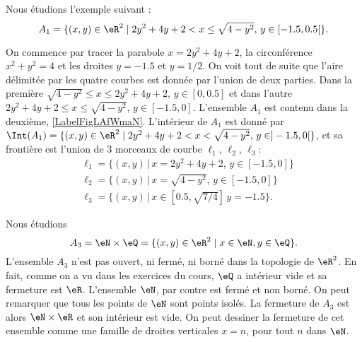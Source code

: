 \begin{example}
    Nous étudions l'exemple suivant :
    \begin{equation}
        A_1 = \{ (x, y ) \in \eR^2 \; | \; 2y^2+4y+2<x\leq \sqrt{4- y^2},\, y\in [-1.5, 0.5[ \}.
    \end{equation}

 On commence par tracer la parabole $x=2y^2+4y+2$, la circonférence $x^2+y^2=4$ et les droites $y=-1.5$ et $y=1/2$. On voit tout de suite que l'aire délimitée par les quatre courbes est donnée par l'union de deux parties. Dans la première $\sqrt{4- y^2}\leq x\leq 2y^2+4y+2$, $y\in [0,0.5]$ et dans l'autre $2y^2+4y+2\leq x\leq \sqrt{4- y^2}$, $y\in [-1.5, 0]$. L'ensemble $A_1$ est contenu dans la deuxième, \ref{LabelFigLAfWmaN}. L'intérieur de $A_1$ est donné par $\Int(A_1) = \{ (x, y ) \in \eR^2 \; | \; 2y^2+4y+2<x< \sqrt{4- y^2},\, y\in ]-1.5, 0[ \}$, et sa frontière est l'union de 3 morceaux de courbe $\ell_1$, $\ell_2$, $\ell_3$:
      \begin{equation}
        \begin{aligned}
          &\ell_1=\{(x,y)\, |\, x=2y^2+4y+2,\, y\in [-1.5, 0] \}\\
          &\ell_2=\{(x,y)\, |\, x=\sqrt{4-y^2},\, y\in [-1.5, 0] \}\\
          &\ell_3=\{(x,y)\, |\, x\in [0.5, \sqrt{7/4}]\, y=-1.5 \}.
        \end{aligned}
      \end{equation}

\newcommand{\CaptionFigLAfWmaN}{}

\end{example}

\begin{example}
    Nous étudions
    \begin{equation}
A_3 = \eN \times \eQ = \{ (x, y ) \in \eR^2 \; | \; x \in \eN , y \in \eQ \}.
    \end{equation}
    L'ensemble $A_3$ n'est pas ouvert, ni fermé, ni borné dans la topologie de $\eR^2$. En fait, comme on a vu dans les exercices du cours, $\eQ$ a intérieur vide et sa fermeture est $\eR$. L'ensemble $\eN$, par contre est fermé et non borné. On peut remarquer que tous les points de $\eN$ sont points isolés. La fermeture de $A_3$ est alors $\eN\times \eR$ et son intérieur est vide. On peut dessiner la fermeture de cet ensemble comme une famille de droites verticales $x=n$, pour tout $n$ dans $\eN$.
\end{example}


